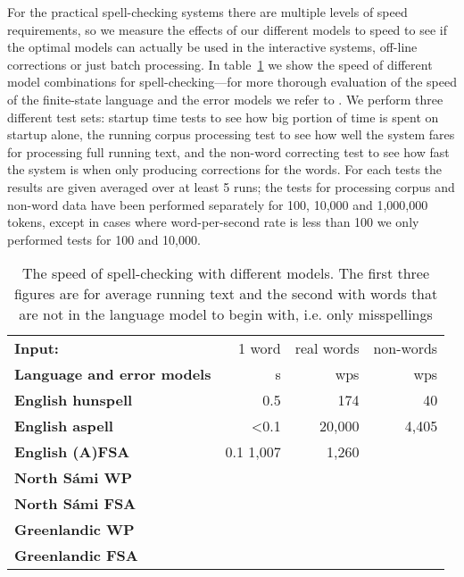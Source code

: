 \documentclass[a4paper,12pt]{article}
\begin{document}
For the practical spell-checking systems there are multiple levels of speed
requirements, so we measure the effects of our different models to speed to see
if the optimal models can actually be used in the interactive systems, off-line
corrections or just batch processing. In table~\ref{table:language-speed} we
show the speed of different model combinations for spell-checking---for more
thorough evaluation of the speed of the finite-state language and the error
models we refer to \cite{pirinen2012improving}. We perform three different test
sets: startup time tests to see how big portion of time is spent on startup
alone, the running corpus processing test to see how well the system fares for
processing full running text, and the non-word correcting test to see how fast
the system is when only producing corrections for the words. For each tests
the results are given averaged over at least 5 runs; the tests for processing
corpus and non-word data have been performed separately for 100, 10,000 and
1,000,000 tokens, except in cases where word-per-second rate is less than 100
we only performed tests for 100 and 10,000.

\begin{table}
    \centering
    \begin{tabular}{|l|r|r|r|}
        \hline
        \bf Input: & 1 word & real words & non-words \\
        \bf Language and error models & s & wps & wps \\
        \hline
        \bf English hunspell & 0.5 & 174 & 40 \\
          \bf English aspell & <0.1 & 20,000 & 4,405 \\

             \bf English (A)FSA & 0.1 1,007 & 1,260 \\
        \hline
        \bf North Sámi WP  & & & \\
        \bf North Sámi FSA & & & \\
        \hline
        \bf Greenlandic WP & & & \\
       \bf Greenlandic FSA & & & \\
        \hline
    \end{tabular}
    \caption{The speed of spell-checking with different models. The first three
    figures are for average running text and the second with words that are not
    in the language model to begin with, i.e. only
    misspellings\label{table:language-speed}}
\end{table}
\end{document}
